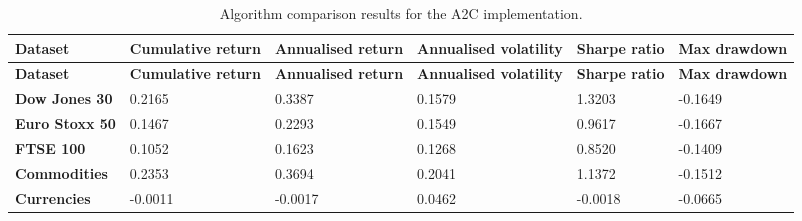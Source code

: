 \begin{longtable}{|l|p{2.1cm}|p{2.1cm}|p{2.1cm}|p{1.5cm}|p{2cm}|}
    \caption{Algorithm comparison results for the A2C implementation.}
    \label{tab:experiment_algorithms_a2c}
    \\ 
    \hline
    \textbf{Dataset} & \textbf{Cumulative return} & \textbf{Annualised return} & \textbf{Annualised volatility} & \textbf{Sharpe ratio} & \textbf{Max drawdown}  \\ \midrule
    \endfirsthead

    \hline
    \textbf{Dataset} & \textbf{Cumulative return} & \textbf{Annualised return} & \textbf{Annualised volatility} & \textbf{Sharpe ratio} & \textbf{Max drawdown}  \\ \midrule
    \endhead

    \endfoot
    \hline

    \textbf{Dow Jones 30} & 0.2165 & 0.3387 & 0.1579 & 1.3203 & -0.1649 \\ \hline
    \textbf{Euro Stoxx 50} & 0.1467 & 0.2293 & 0.1549 & 0.9617 & -0.1667 \\ \hline
    \textbf{FTSE 100} & 0.1052 & 0.1623 & 0.1268 & 0.8520 & -0.1409 \\ \hline
    \textbf{Commodities} & 0.2353 & 0.3694 & 0.2041 & 1.1372 & -0.1512 \\ \hline
    \textbf{Currencies} & -0.0011 & -0.0017 & 0.0462 & -0.0018 & -0.0665 \\ \hline 
\end{longtable}